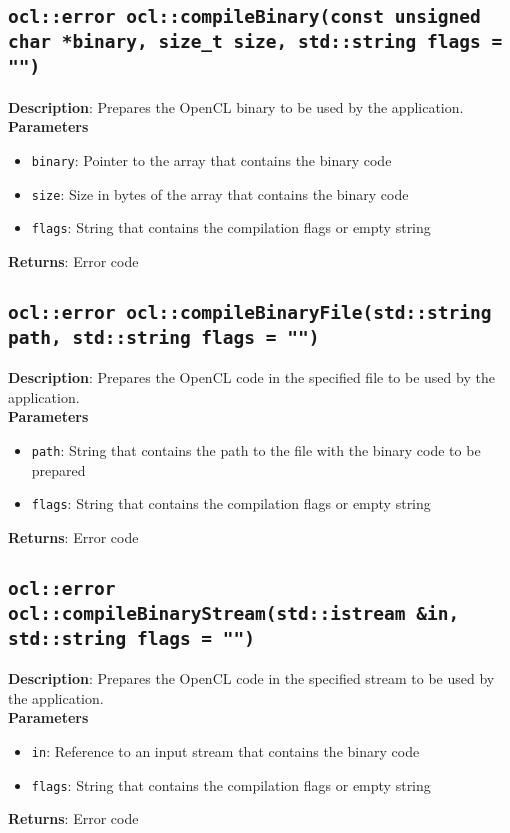 \subsection{\texttt{ocl::error ocl::compileBinary(const unsigned char *binary, size\_t size, 
std::string flags = "")}}

\textbf{Description}: Prepares the OpenCL binary to be used by the application.  \\
\textbf{Parameters}
\begin{itemize}
  \item \texttt{binary}: Pointer to the array that contains the binary code
  \item \texttt{size}: Size in bytes of the array that contains the binary code
  \item \texttt{flags}: String that contains the compilation flags or empty string
\end{itemize}
\textbf{Returns}: Error code

\subsection{\texttt{ocl::error ocl::compileBinaryFile(std::string path, std::string flags = "")}}

\textbf{Description}: Prepares the OpenCL code in the specified file to be used by the application.  \\
\textbf{Parameters}
\begin{itemize}
  \item \texttt{path}: String that contains the path to the file with the binary code to be prepared
  \item \texttt{flags}: String that contains the compilation flags or empty string
\end{itemize}
\textbf{Returns}: Error code

\subsection{\texttt{ocl::error ocl::compileBinaryStream(std::istream \&in, std::string flags = "")}}

\textbf{Description}: Prepares the OpenCL code in the specified stream to be used by the 
application.  \\
\textbf{Parameters}
\begin{itemize}
  \item \texttt{in}: Reference to an input stream that contains the binary code
  \item \texttt{flags}: String that contains the compilation flags or empty string
\end{itemize}
\textbf{Returns}: Error code


